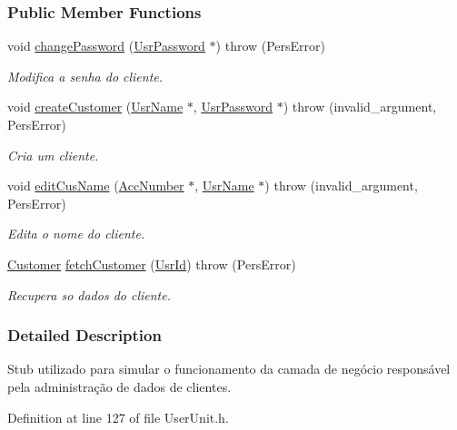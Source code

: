 \subsubsection*{Public Member Functions}
\begin{DoxyCompactItemize}
\item 
void \hyperlink{classStubUserCusAdm_a7e44bec3dc4fb0640e6eb418dd8e8320}{change\-Password} (\hyperlink{classUsrPassword}{Usr\-Password} $\ast$)  throw (\-Pers\-Error)
\begin{DoxyCompactList}\small\item\em Modifica a senha do cliente. \end{DoxyCompactList}\item 
void \hyperlink{classStubUserCusAdm_a53dc0deb3cf26a09c2814504b0daab63}{create\-Customer} (\hyperlink{classUsrName}{Usr\-Name} $\ast$, \hyperlink{classUsrPassword}{Usr\-Password} $\ast$)  throw (invalid\-\_\-argument, Pers\-Error)
\begin{DoxyCompactList}\small\item\em Cria um cliente. \end{DoxyCompactList}\item 
void \hyperlink{classStubUserCusAdm_a84ca3047ccb0ac2e371a23c4e4fcdba0}{edit\-Cus\-Name} (\hyperlink{classAccNumber}{Acc\-Number} $\ast$, \hyperlink{classUsrName}{Usr\-Name} $\ast$)  throw (invalid\-\_\-argument, Pers\-Error)
\begin{DoxyCompactList}\small\item\em Edita o nome do cliente. \end{DoxyCompactList}\item 
\hyperlink{classCustomer}{Customer} \hyperlink{classStubUserCusAdm_aac14b018a6284211b1c83c48a9529efe}{fetch\-Customer} (\hyperlink{classUsrId}{Usr\-Id})  throw (\-Pers\-Error)
\begin{DoxyCompactList}\small\item\em Recupera so dados do cliente. \end{DoxyCompactList}\end{DoxyCompactItemize}


\subsubsection{Detailed Description}
Stub utilizado para simular o funcionamento da camada de negócio responsável pela administração de dados de clientes. 

Definition at line 127 of file User\-Unit.\-h.



